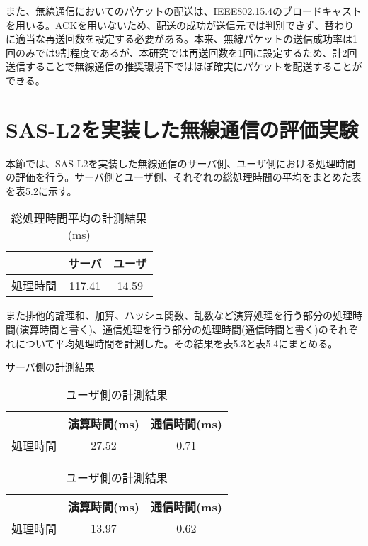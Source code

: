 \documentclass{thesis}
\begin{document}
また、無線通信においてのパケットの配送は、IEEE802.15.4のブロードキャストを用いる。ACKを用いないため、配送の成功が送信元では判別できず、替わりに適当な再送回数を設定する必要がある。本来、無線パケットの送信成功率は1回のみでは9割程度であるが、本研究では再送回数を1回に設定するため、計2回送信することで無線通信の推奨環境下ではほぼ確実にパケットを配送することができる。

\section{SAS-L2を実装した無線通信の評価実験}
本節では、SAS-L2を実装した無線通信のサーバ側、ユーザ側における処理時間の評価を行う。サーバ側とユーザ側、それぞれの総処理時間の平均をまとめた表を表5.2に示す。

\begin{table}[h]
  \centering
  \caption{総処理時間平均の計測結果(ms)}
  \begin{tabular}{|c|c|c|} \hline
     & サーバ & ユーザ \\ \hline
    処理時間 & 117.41 & 14.59 \\ \hline
  \end{tabular}
\end{table}

また排他的論理和、加算、ハッシュ関数、乱数など演算処理を行う部分の処理時間(演算時間と書く)、通信処理を行う部分の処理時間(通信時間と書く)のそれぞれについて平均処理時間を計測した。その結果を表5.3と表5.4にまとめる。

\begin{table}[h]
  \begin{minipage}[c]{0.5\hsize}
    \centering
    \caption{サーバ側の計測結果}
    \begin{tabular}{|c|c|c|} \hline
      & 演算時間(ms) & 通信時間(ms) \\ \hline
      処理時間 & 27.52 & 0.71 \\ \hline
    \end{tabular}
  \end{minipage}
  \begin{minipage}[c]{0.5\hsize}
    \centering
    \caption{ユーザ側の計測結果}
    \begin{tabular}{|c|c|c|} \hline
      & 演算時間(ms) & 通信時間(ms) \\ \hline
      処理時間 & 13.97 & 0.62 \\ \hline
    \end{tabular}
  \end{minipage}
\end{table}
\end{document}

